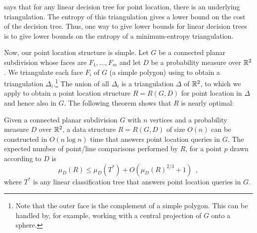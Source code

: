 \documentclass[lotsofwhite]{patmorin}
\begin{document}
 says that for any linear decision tree for point
location, there is an underlying triangulation.  The entropy of this
triangulation gives a lower bound on the cost of the decision tree.
Thus, one way to give lower bounds for linear decision trees is to
give lower bounds on the entropy of a minimum-entropy triangulation.

Now, our point location structure is simple.  Let $G$ be a connected
planar subdivision whose faces are $F_1,\ldots,F_m$ and let $D$ be a
probability measure over $\mathbb{R}^2$.  We triangulate each face $F_i$ of
$G$ (a simple polygon) using  to obtain a
triangulation $\Delta_i$.\footnote{Note that the outer face is the
complement of a simple polygon.  This can be handled by, for example,
working with a central projection of $G$ onto a sphere.} The union of
all $\Delta_i$ is a triangulation $\Delta$ of $\mathbb{R}^2$, to which we
apply  to obtain a point location structure $R=R(G,D)$
for point location in $\Delta$ and hence also in $G$.  The following
theorem shows that $R$ is nearly optimal:

\begin{thm}
Given a connected planar subdivision $G$ with $n$ vertices and a probability
measure $D$ over $\mathbb{R}^2$, a data structure $R=R(G,D)$ of size $O(n)$ can be
constructed in $O(n\log n)$ time that answers point location queries in $G$.
The expected number of point/line comparisons performed by $R$, 
for a point $p$ drawn according to $D$ is 
\[
  \mu_D(R) \le \mu_D(T^*) + O(\mu_D(R)^{2/3}+1) \enspace , 
\] 
where $T^*$ is any linear classification tree that answers point
location queries in $G$.
\end{thm}
\end{document}
